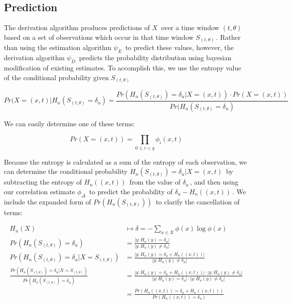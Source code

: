 \documentclass[10pt]{article}
\begin{document}
\subsection{Prediction}
The derivation algorithm produces predictions of \(X \,\!\) over a time window \((t,\theta) \,\!\) based on a set of observations which occur in that time window \(S_{(t,\theta)} \,\!\).  Rather than using the estimation algorithm \(\psi_E \,\!\) to predict these values, however, the derivation algorithm \(\psi_D \,\!\) predicts the probability distribution  using bayesian modification of existing estimates.  To accomplish this, we use the entropy value of the conditional probability given \(S_{(t,\theta)} \,\!\)

\[ Pr( X = (x,t) | H_n(S_{(t,\theta)} = \delta_u ) = \frac { Pr( H_n( S_{(t,\theta)} ) = \delta_u | X = (x,t) ) \cdot Pr( X = (x,t) ) } { Pr( H_n( S_{(t,\theta)} = \delta_u ) } \]

We can easily determine one of these terms:

\[ Pr( X = (x,t) ) = \prod_{0 \le i < q} \phi_i(x,t) \]

Because the entropy is calculated as a sum of the entropy of each observation, we can determine the conditional probability \(H_n(S_{(t,\theta)}) = \delta_u | X = (x,t) \,\!\) by subtracting the entropy of \(H_n((x,t)) \,\!\) from the value of \(\delta_u \,\!\), and then using our correlation estimate \(\phi_\Delta \,\!\) to predict the probability of \(\delta_u - H_n((x,t)) \,\!\).  We include the expanded form of \(Pr( H_n(S_{(t,\theta)}) ) \,\!\) to clarify the cancellation of terms:

\begin{align*}
H_n(X) &\mapsto \delta= -\sum_{x \in X} \phi(x) \log \phi(x) \\
Pr( H_n(S_{(t,\theta)}) = \delta_u ) &= \frac{ | y : H_n(y) = \delta_u | }{ | y : H_n(y) \ne \delta_u | } \\
Pr( H_n(S_{(t,\theta)}) = \delta_u | X = S_{(t,\theta)} ) &= \frac{ | y : H_n(y) = \delta_u + H_n((x,t)) | }{ | y : H_n(y) \ne \delta_u | } \\
\frac{ Pr( H_n( S_{(t,\theta)} ) = \delta_u | X = S_{(t,\theta)} ) }{ Pr( H_n( S_{(t,\theta)} ) = \delta_u ) } &= \frac{ | y : H_n(y) = \delta_u + H_n((x,t)) | \cdot | y : H_n(y) \ne \delta_u | }
{ | y : H_n(y) = \delta_u | \cdot | y : H_n(y) \ne \delta_u | } \\
&= \frac{ Pr( H_n((x,t)) = \delta_u + H_n((x,t)) ) }{ Pr( H_n((x,t)) = \delta_u ) } 
\end{align*}
\end{document}
